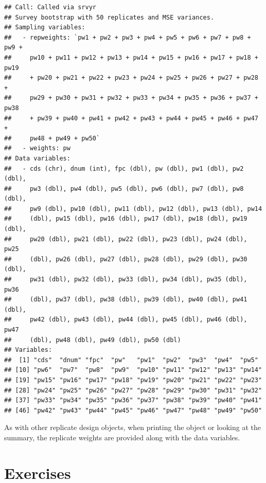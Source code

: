 \documentclass[
]{krantz}
\begin{document}
\begin{verbatim}
## Call: Called via srvyr
## Survey bootstrap with 50 replicates and MSE variances.
## Sampling variables:
##   - repweights: `pw1 + pw2 + pw3 + pw4 + pw5 + pw6 + pw7 + pw8 + pw9 +
##     pw10 + pw11 + pw12 + pw13 + pw14 + pw15 + pw16 + pw17 + pw18 + pw19
##     + pw20 + pw21 + pw22 + pw23 + pw24 + pw25 + pw26 + pw27 + pw28 +
##     pw29 + pw30 + pw31 + pw32 + pw33 + pw34 + pw35 + pw36 + pw37 + pw38
##     + pw39 + pw40 + pw41 + pw42 + pw43 + pw44 + pw45 + pw46 + pw47 +
##     pw48 + pw49 + pw50` 
##   - weights: pw 
## Data variables: 
##   - cds (chr), dnum (int), fpc (dbl), pw (dbl), pw1 (dbl), pw2 (dbl),
##     pw3 (dbl), pw4 (dbl), pw5 (dbl), pw6 (dbl), pw7 (dbl), pw8 (dbl),
##     pw9 (dbl), pw10 (dbl), pw11 (dbl), pw12 (dbl), pw13 (dbl), pw14
##     (dbl), pw15 (dbl), pw16 (dbl), pw17 (dbl), pw18 (dbl), pw19 (dbl),
##     pw20 (dbl), pw21 (dbl), pw22 (dbl), pw23 (dbl), pw24 (dbl), pw25
##     (dbl), pw26 (dbl), pw27 (dbl), pw28 (dbl), pw29 (dbl), pw30 (dbl),
##     pw31 (dbl), pw32 (dbl), pw33 (dbl), pw34 (dbl), pw35 (dbl), pw36
##     (dbl), pw37 (dbl), pw38 (dbl), pw39 (dbl), pw40 (dbl), pw41 (dbl),
##     pw42 (dbl), pw43 (dbl), pw44 (dbl), pw45 (dbl), pw46 (dbl), pw47
##     (dbl), pw48 (dbl), pw49 (dbl), pw50 (dbl)
## Variables: 
##  [1] "cds"  "dnum" "fpc"  "pw"   "pw1"  "pw2"  "pw3"  "pw4"  "pw5" 
## [10] "pw6"  "pw7"  "pw8"  "pw9"  "pw10" "pw11" "pw12" "pw13" "pw14"
## [19] "pw15" "pw16" "pw17" "pw18" "pw19" "pw20" "pw21" "pw22" "pw23"
## [28] "pw24" "pw25" "pw26" "pw27" "pw28" "pw29" "pw30" "pw31" "pw32"
## [37] "pw33" "pw34" "pw35" "pw36" "pw37" "pw38" "pw39" "pw40" "pw41"
## [46] "pw42" "pw43" "pw44" "pw45" "pw46" "pw47" "pw48" "pw49" "pw50"
\end{verbatim}

As with other replicate design objects, when printing the object or looking at the summary, the replicate weights are provided along with the data variables.

\hypertarget{exercises-2}{%
\section{Exercises}\label{exercises-2}}
\end{document}
